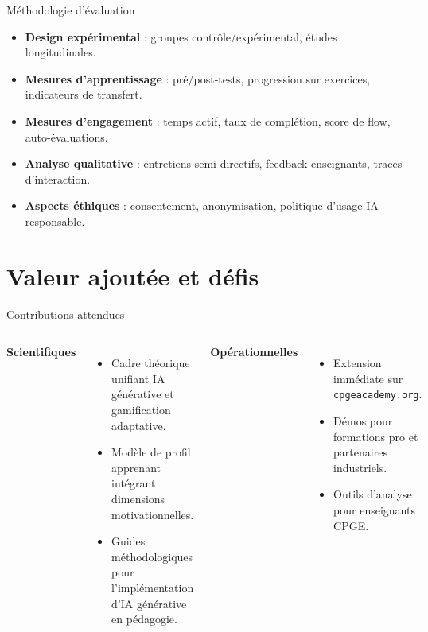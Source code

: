\documentclass[aspectratio=169]{beamer}
\begin{document}
\begin{frame}{Méthodologie d'évaluation}
  \begin{itemize}
    \item \textbf{Design expérimental} : groupes contrôle/expérimental, études longitudinales.
    \item \textbf{Mesures d'apprentissage} : pré/post-tests, progression sur exercices, indicateurs de transfert.
    \item \textbf{Mesures d'engagement} : temps actif, taux de complétion, score de flow, auto-évaluations.
    \item \textbf{Analyse qualitative} : entretiens semi-directifs, feedback enseignants, traces d'interaction.
    \item \textbf{Aspects éthiques} : consentement, anonymisation, politique d'usage IA responsable.
  \end{itemize}
\end{frame}

\section{Valeur ajoutée et défis}

\begin{frame}{Contributions attendues}
  \begin{columns}
    \textbf{Scientifiques}
    \begin{itemize}
      \item Cadre théorique unifiant IA générative et gamification adaptative.
      \item Modèle de profil apprenant intégrant dimensions motivationnelles.
      \item Guides méthodologiques pour l'implémentation d'IA générative en pédagogie.
    \end{itemize}
    \textbf{Opérationnelles}
    \begin{itemize}
      \item Extension immédiate sur \texttt{cpgeacademy.org}.
      \item Démos pour formations pro et partenaires industriels.
      \item Outils d'analyse pour enseignants CPGE.
    \end{itemize}
  \end{columns}
\end{frame}
\end{document}
